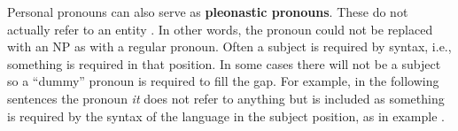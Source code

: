 \documentclass[a4paper]{article}
\begin{document}
{{%
% 
% 
% 
% 
% 
% 

Personal pronouns can also serve as {\bf pleonastic pronouns}. These do not
actually refer to an entity \cite[p. 5]{GuillouEtAlGuide}. In other words, the
pronoun could not be replaced with an NP as with a regular pronoun. Often a
subject is required by syntax, i.e., something is required in that position. In
some cases there will not be a subject so a ``dummy'' pronoun is required to
fill the gap. For example, in the following sentences the pronoun {\sl it} does
not refer to anything but is included as something is required by the syntax of
the language in the subject position, as in example \Next.

}}
\end{document}
